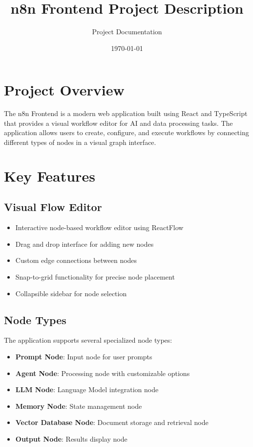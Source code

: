 \documentclass{article}
\title{n8n Frontend Project Description}
\author{Project Documentation}
\date{\today}
\begin{document}
\maketitle

\section{Project Overview}
The n8n Frontend is a modern web application built using React and TypeScript that provides a visual workflow editor for AI and data processing tasks. The application allows users to create, configure, and execute workflows by connecting different types of nodes in a visual graph interface.

\section{Key Features}

\subsection{Visual Flow Editor}
\begin{itemize}
    \item Interactive node-based workflow editor using ReactFlow
    \item Drag and drop interface for adding new nodes
    \item Custom edge connections between nodes
    \item Snap-to-grid functionality for precise node placement
    \item Collapsible sidebar for node selection
\end{itemize}

\subsection{Node Types}
The application supports several specialized node types:
\begin{itemize}
    \item \textbf{Prompt Node}: Input node for user prompts
    \item \textbf{Agent Node}: Processing node with customizable options
    \item \textbf{LLM Node}: Language Model integration node
    \item \textbf{Memory Node}: State management node
    \item \textbf{Vector Database Node}: Document storage and retrieval node
    \item \textbf{Output Node}: Results display node
\end{itemize}
\end{document}

